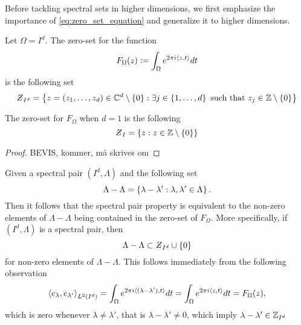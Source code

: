 \documentclass[../thesis.tex]{subfiles}
\begin{document}
Before tackling spectral sets in higher dimensions, we first emphasize the importance of \cref{eq:zero_set_equation} and generalize it to higher dimensions. 
\begin{lemma}\label{lem:zero_set_jp_1_5}
    Let $\Omega=I^d$. The zero-set for the function
    \begin{equation*}
        F_{\Omega} (z):= \int_\Omega e^{2 \pi i \langle z,t\rangle} dt
    \end{equation*}
    is the following set
    \begin{equation*}
        \Zstroke_{I^d} = \braqMed{ z = \brac{z_1,\dots,z_d}\in \C^d \setminus \braqMed{0} : \exists \space j \in \braqMed{1,\dots, d} \text{ such that } z_j \in  \intnozero}
    \end{equation*}
\end{lemma}

\begin{example}
    The zero-set for $F_{\Omega}$ when $d=1$ is the following
    \begin{equation*}
        \Zstroke_{I} = \braq{z: z \in \intnozero}
    \end{equation*}
\end{example}

\begin{proof}
    BEVIS, kommer, må skrives om
\end{proof}

\begin{remark}
    Given a spectral pair $(I^d,\Lambda)$ and the following set 
    \begin{equation*}
        \Lambda - \Lambda = \left\{\lambda-\lambda' : \lambda,\lambda' \in \Lambda\right\}.
    \end{equation*}
    Then it follows that the spectral pair property is equivalent to the non-zero elements of $\Lambda - \Lambda$ being contained in the zero-set of $F_{\Omega}$. More specifically, if $(I^d,\Lambda)$ is a spectral pair, then
    \begin{equation*}
        \Lambda - \Lambda \subset \Zstroke_{I^d} \cup \braq{0}
    \end{equation*}
    for non-zero elements of $\Lambda-\Lambda$. This follows immediately from the following observation
    \begin{equation*}
        \left \langle e_{\lambda},e_{\lambda'}  \right \rangle_{L^2(I^d)} = \int_\Omega e^{2 \pi i \langle(\lambda-\lambda'),t\rangle} dt = \int_\Omega e^{2 \pi i \langle z,t\rangle} dt  = F_{\Omega} (z),
    \end{equation*}
    which is zero whenever $\lambda \neq \lambda'$, that is $\lambda-\lambda'\neq 0$, which imply $\lambda-\lambda' \in \mathbb{Z}_{I^d}$
\end{remark}
\end{document}
